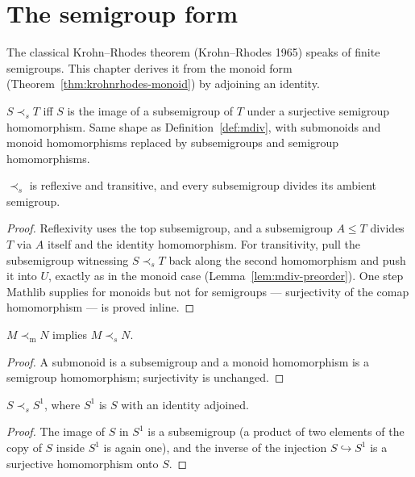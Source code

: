 \chapter{The semigroup form}\label{ch:semigroup}

The classical Krohn--Rhodes theorem (Krohn--Rhodes 1965) speaks of finite
semigroups. This chapter derives it from the monoid form
(Theorem~\ref{thm:krohnrhodes-monoid}) by adjoining an identity.

\begin{definition}\label{def:semdiv}
  \leanok
  $S \prec_s T$ iff $S$ is the image of a subsemigroup of $T$ under a
  surjective semigroup homomorphism. Same shape as
  Definition~\ref{def:mdiv}, with submonoids and monoid homomorphisms
  replaced by subsemigroups and semigroup homomorphisms.
\end{definition}

\begin{lemma}\label{lem:semdiv-preorder}
  \leanok
  $\prec_s$ is reflexive and transitive, and every subsemigroup divides
  its ambient semigroup.
\end{lemma}
\begin{proof}
  \leanok
  Reflexivity uses the top subsemigroup, and a subsemigroup $A \le T$
  divides $T$ via $A$ itself and the identity homomorphism. For
  transitivity, pull the subsemigroup witnessing $S \prec_s T$ back
  along the second homomorphism and push it into $U$, exactly as in the
  monoid case
  (Lemma~\ref{lem:mdiv-preorder}). One step Mathlib supplies for
  monoids but not for semigroups --- surjectivity of the comap
  homomorphism --- is proved inline.
\end{proof}

\begin{lemma}\label{lem:semdiv-of-mdiv}
  \leanok
  $M \prec_{\mathrm m} N$ implies $M \prec_s N$.
\end{lemma}
\begin{proof}
  \leanok
  A submonoid is a subsemigroup and a monoid homomorphism is a
  semigroup homomorphism; surjectivity is unchanged.
\end{proof}

\begin{lemma}\label{lem:withone-transfer}
  \leanok
  $S \prec_s S^1$, where $S^1$ is $S$ with an identity adjoined.
\end{lemma}
\begin{proof}
  \leanok
  The image of $S$ in $S^1$ is a subsemigroup (a product of two
  elements of the copy of $S$ inside $S^1$ is again one), and the
  inverse of the injection $S \hookrightarrow S^1$ is a surjective
  homomorphism onto $S$.
\end{proof}

